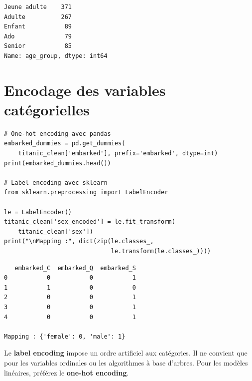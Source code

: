 \begin{codeoutput}
\begin{verbatim}
Jeune adulte    371
Adulte          267
Enfant           89
Ado              79
Senior           85
Name: age_group, dtype: int64
\end{verbatim}
\end{codeoutput}

\section{Encodage des variables cat\'egorielles}

\begin{codeblock}[title=\textbf{Python}]
\begin{verbatim}
# One-hot encoding avec pandas
embarked_dummies = pd.get_dummies(
    titanic_clean['embarked'], prefix='embarked', dtype=int)
print(embarked_dummies.head())

# Label encoding avec sklearn
from sklearn.preprocessing import LabelEncoder

le = LabelEncoder()
titanic_clean['sex_encoded'] = le.fit_transform(
    titanic_clean['sex'])
print("\nMapping :", dict(zip(le.classes_,
                              le.transform(le.classes_))))
\end{verbatim}
\end{codeblock}

\begin{codeoutput}
\begin{verbatim}
   embarked_C  embarked_Q  embarked_S
0           0           0           1
1           1           0           0
2           0           0           1
3           0           0           1
4           0           0           1

Mapping : {'female': 0, 'male': 1}
\end{verbatim}
\end{codeoutput}

\begin{attention}
Le \textbf{label encoding} impose un ordre artificiel aux cat\'egories. Il ne convient que pour les variables ordinales ou les algorithmes \`a base d'arbres. Pour les mod\`eles lin\'eaires, pr\'ef\'erez le \textbf{one-hot encoding}.
\end{attention}

